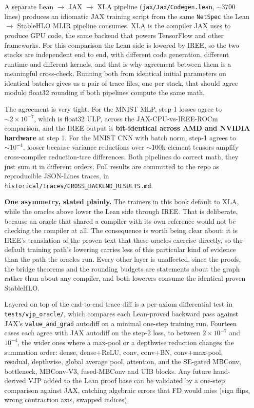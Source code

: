 A separate Lean \(\to\) JAX \(\to\) XLA pipeline
(\texttt{jax/Jax/Codegen.lean}, \(\sim 3700\) lines) produces an
idiomatic JAX training script from the same \texttt{NetSpec} the
Lean \(\to\) StableHLO MLIR pipeline consumes. XLA is the compiler
JAX uses to produce GPU code, the same backend that powers
TensorFlow and other frameworks. For this comparison the Lean side
is lowered by IREE, so the two stacks are independent end to end,
with different code generation, different runtime and different
kernels, and that is why agreement between them is a meaningful
cross-check. Running both from identical initial parameters on
identical batches gives us a pair of trace files, one per stack,
that should agree modulo float32 rounding if both pipelines compute
the same math.

The agreement is very tight. For the MNIST MLP, step-1 losses agree
to \(\sim 2 \times 10^{-7}\), which is float32 ULP, across the
JAX-CPU-vs-IREE-ROCm comparison, and the IREE output is
\textbf{bit-identical across AMD and NVIDIA hardware} at step 1.
For the MNIST CNN with batch norm, step-1 agrees to
\(\sim 10^{-4}\), looser because variance reductions over
\(\sim 100\)k-element tensors amplify cross-compiler reduction-tree
differences. Both pipelines do correct math, they just sum it
in different orders. Full results are committed to the repo as
reproducible JSON-Lines traces, in
\texttt{historical/traces/CROSS\_BACKEND\_RESULTS.md}.

\medskip\noindent\textbf{One asymmetry, stated plainly.} The trainers in this
book default to XLA, while the oracles above lower the Lean side through IREE.
That is deliberate, because an oracle that shared a compiler with its own
reference would not be checking the compiler at all. The consequence is worth
being clear about: it is IREE's translation of the proven text that these
oracles exercise directly, so the default training path's lowering carries less
of this particular kind of evidence than the path the oracles run. Every other
layer is unaffected, since the proofs, the bridge theorems and the
rounding budgets are statements about the graph rather than about any
compiler, and both lowerers consume the identical proven StableHLO.

Layered on top of the end-to-end trace diff is a per-axiom
differential test in \texttt{tests/vjp\_oracle/}, which compares
each Lean-proved backward pass against JAX's
\texttt{value\_and\_grad} autodiff on a minimal one-step training
run. Fourteen cases each agree with JAX autodiff on the step-2 loss, to
between \(2 \times 10^{-7}\) and \(10^{-4}\), the wider ones where a
max-pool or a depthwise reduction changes the summation order: dense,
dense+ReLU, conv, conv+BN, conv+max-pool, residual, depthwise, global
average pool, attention, and the SE-gated MBConv, bottleneck, MBConv-V3,
fused-MBConv and UIB blocks. Any future hand-derived VJP added to
the Lean proof base can be validated by a one-step comparison
against JAX, catching algebraic errors that FD would miss (sign
flips, wrong contraction axis, swapped indices).

